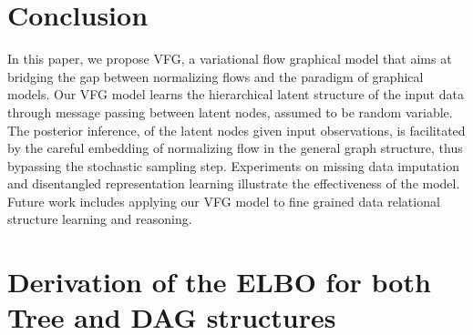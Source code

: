 \documentclass[twoside]{article}
\begin{document}
\vspace{-0.05in}
\section{Conclusion}\label{sec:conclusion}
\vspace{-0.05in}
In this paper, we propose VFG, a variational flow graphical model that aims at bridging the gap between normalizing flows and the paradigm of graphical models.
Our VFG model learns the hierarchical latent structure of the input data through message passing between latent nodes, assumed to be random variable.
The posterior inference, of the latent nodes given input observations, is facilitated by the careful embedding of normalizing flow in the general graph structure, thus bypassing the stochastic sampling step.
Experiments on missing data imputation and disentangled representation learning illustrate the effectiveness of the model. 
Future work includes applying our VFG model to fine grained data relational structure learning and reasoning. 







\newpage
\appendix
%

\onecolumn

  \hsize\textwidth
  \linewidth\hsize {}
 \bottomtitlebar 




\section{Derivation of the ELBO for both Tree and DAG structures}
\end{document}
